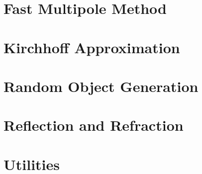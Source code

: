 \documentclass[10pt,letterpaper]{book}
\begin{document}
\chapter{Fast Multipole Method}
\label{chap:fmm}


\chapter{Kirchhoff Approximation}


\chapter{Random Object Generation}


\chapter{Reflection and Refraction}


\chapter{Utilities}
\label{chap:util}  








\end{document}
